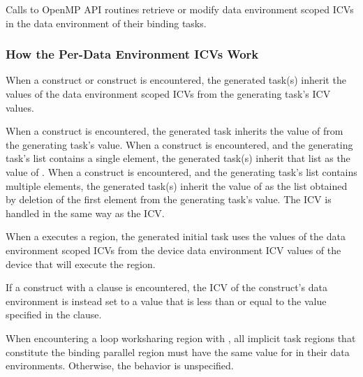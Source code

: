 Calls to OpenMP API routines retrieve or modify data environment scoped ICVs in the 
data environment of their binding tasks.










\subsubsection{How the Per-Data Environment ICVs Work}
\label{subsubsec:How the Per-Data Environment ICVs Work}
When a  construct or  construct is encountered, the generated task(s)
inherit the values of the data environment scoped ICVs from the generating task's ICV
values.

When a  construct is encountered, the generated task inherits the value of
 from the generating task's  value. When a 
construct is encountered, and the generating task's  list contains a single
element, the generated task(s) inherit that list as the value of . When a
 construct is encountered, and the generating task's  list contains 
multiple elements, the generated task(s) inherit the value of  as the list 
obtained by deletion of the first element from the generating task's  value. 
The  ICV is handled in the same way as the  ICV.

When a  executes a  region, the generated initial task uses the values of the data environment scoped ICVs from the device data environment ICV values of the device that will execute the region. 

If a  construct with a  clause is encountered, 
the  ICV of the construct's data environment is instead set to a value that is less than or equal to the value specified in the clause.  

When encountering a loop worksharing region with , all 
implicit task regions that constitute the binding parallel region must have the same value 
for  in their data environments. Otherwise, the behavior is unspecified.








